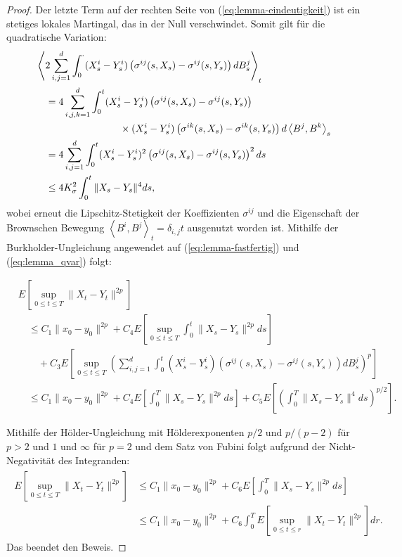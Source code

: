\documentclass[10pt, a4paper, leqno, twoside, bibliography=totocnumbered, final]{scrartcl}
\theoremstyle{definition}
\theoremstyle{plain}%
\theoremstyle{remark}
\DeclareRobustCommand{\qvar}[1]{\ensuremath{\left\langle {#1} \right\rangle}}
\begin{document}
\begin{proof}
Der letzte Term auf der rechten Seite von (\ref{eq:lemma-eindeutigkeit}) ist ein stetiges lokales Martingal, das in der Null verschwindet. Somit gilt für die quadratische Variation:
\begin{align}
\label{eq:lemma_qvar}
\begin{split}
& \qvar{ 2 \sum_{i,j = 1}^d \int_0^{\cdot} ( X^i_s - Y^i_s ) \left( \sigma^{ij}(s,X_s) - \sigma^{ij}(s,Y_s) \right) dB^j_s}_t \\
& \quad = 4\sum_{i,j,k = 1}^d \int_0^t ( X^i_s - Y^i_s ) \left( \sigma^{ij}(s,X_s) - \sigma^{ij}(s,Y_s) \right) \\
& \hspace*{3cm} \times ( X^i_s - Y^i_s ) \left( \sigma^{ik}(s,X_s) - \sigma^{ik}(s,Y_s) \right) d \qvar{B^j,B^k}_s \\
& \quad =  4\sum_{i,j = 1}^d \int_0^t ( X^i_s - Y^i_s )^2 \left( \sigma^{ij}(s,X_s) - \sigma^{ij}(s,Y_s) \right)^2 ds \\
& \quad \leq 4 K_{\sigma}^2 \int_0^t \| X_s - Y_s \|^4 ds,
\end{split}
\end{align}
wobei erneut die Lipschitz-Stetigkeit der Koeffizienten $ \sigma^{ij} $ und die Eigenschaft der Brownschen Bewegung $ \qvar{B^i, B^j}_ t = \delta_{i,j} t $ ausgenutzt worden ist. Mithilfe der Burkholder-Ungleichung angewendet auf (\ref{eq:lemma-fastfertig}) und (\ref{eq:lemma_qvar}) folgt:

\begin{align*}
& E \left[ \sup_{0 \leq t \leq T}  \| X_t - Y_t \|^{2p} \right] \\
& \quad  \leq C_1 \| x_0 -y_0 \|^{2p} + C_4 E \left[ \sup_{0 \leq t \leq T} \int_0^t \| X_s -Y_s \|^{2p} ds  \right] \\
& \qquad + C_3 E \left[ \sup_{0 \leq t \leq T} \left(   \sum_{i,j = 1}^d \int_0^{t} ( X^i_s - Y^i_s ) \left( \sigma^{ij}(s,X_s) - \sigma^{ij}(s,Y_s) \right) dB^j_s \right)^{p}  \right] \\
& \quad \leq C_1 \| x_0 -y_0 \|^{2p} + C_4 E \left[  \int_0^T \| X_s -Y_s \|^{2p} ds  \right] + C_5 E \left[ \left( \int_0^T \| X_s - Y_s \|^4 ds \right)^{p/2} \right].
\end{align*}

Mithilfe der Hölder-Ungleichung mit Hölderexponenten $ p/2 $ und $ p/(p-2) $ für $ p>2 $ und $ 1 $ und $ \infty $ für $ p=2 $ und dem Satz von Fubini folgt aufgrund der Nicht-Negativität des Integranden:
\begin{align*}
\label{eq:lemma-letzte_gleichung}
\begin{split}
 E \left[ \sup_{0 \leq t \leq T}  \| X_t - Y_t \|^{2p} \right] & \leq C_1 \| x_0 -y_0 \|^{2p} + C_6 E \left[  \int_0^T \| X_s -Y_s \|^{2p} ds  \right] \\
 & \leq  C_1 \| x_0 -y_0 \|^{2p} + C_6 \int_0^T E \left[ \sup_{0 \leq t \leq r}  \| X_t - Y_t \|^{2p}  \right] dr.
\end{split}
\end{align*}
Das beendet den Beweis.

\end{proof}
\end{document}
